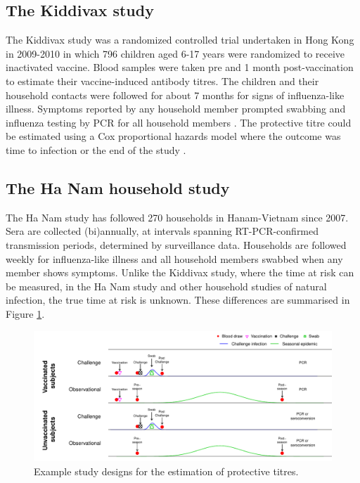 \documentclass[12pt]{article}
\begin{document}
\subsection{The Kiddivax study}

The Kiddivax study was a randomized controlled trial undertaken in Hong Kong in 2009-2010 in which 796 children aged 6-17 years were randomized to receive inactivated vaccine. Blood samples were taken pre and 1 month post-vaccination to estimate their vaccine-induced antibody titres.  The children and their household contacts were followed for about 7 months for signs of influenza-like illness. Symptoms reported by any household member prompted swabbing and influenza testing by PCR for all household members \citep{Cowling;2013}. The protective titre could be estimated using a Cox proportional hazards model where the outcome was time to infection or the end of the study \citep{Ng;2013}.

\subsection{The Ha Nam household study}
The Ha Nam study has followed 270 households in Hanam-Vietnam since 2007. Sera are collected (bi)annually, at intervals spanning RT-PCR-confirmed transmission periods, determined by surveillance data. Households are followed weekly for influenza-like illness and all household members swabbed when any member shows symptoms. Unlike the Kiddivax study, where the time at risk can be measured, in the Ha Nam study and other household studies of natural infection, the true time at risk is unknown. These differences are summarised in Figure \ref{Studies}.

\begin{figure}[htp]
	\centering
	\includegraphics[width=\linewidth]{../fig-studies/fig-studies.pdf}
	\caption{\footnotesize
	Example study designs for the estimation of protective titres.
}
\label{Studies}
\end{figure}
\end{document}
